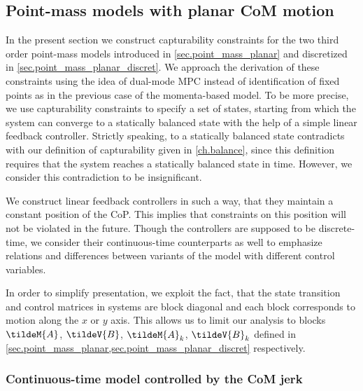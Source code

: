 \subsection{Point-mass models with planar CoM motion}\label{sec.point_mass_planar_capturability}

In the present section we construct capturability constraints for the two third
order point-mass models introduced in \cref{sec.point_mass_planar} and
discretized in \cref{sec.point_mass_planar_discret}. We approach the derivation
of these constraints using the idea of dual-mode \ac{MPC} instead of
identification of fixed points as in the previous case of the momenta-based
model. To be more precise, we use capturability constraints to specify a set of
states, starting from which the system can converge to a statically balanced
state with the help of a simple linear feedback controller. Strictly speaking,
 to a statically balanced state contradicts with our definition
of capturability given in \cref{ch.balance}, since this definition requires
that the system reaches a statically balanced state in  time.
However, we consider this contradiction to be insignificant.


We construct linear feedback controllers in such a way, that they maintain a
constant position of the \ac{CoP}. This implies that constraints on this
position will not be violated in the future. Though the controllers are
supposed to be discrete-time, we consider their continuous-time counterparts as
well to emphasize relations and differences between variants of the model with
different control variables.


In order to simplify presentation, we exploit the fact, that the state
transition and control matrices in systems are block diagonal and each block
corresponds to motion along the $x$ or $y$ axis. This allows us to limit our
analysis to blocks $\tildeM{A}$, $\tildeV{B}$, $\tildeM{A}_k$, $\tildeV{B}_k$
defined in \cref{sec.point_mass_planar,sec.point_mass_planar_discret}
respectively.



\subsubsection{Continuous-time model controlled by the CoM jerk}

